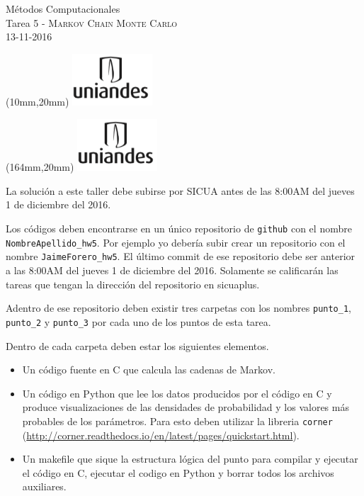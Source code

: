 \documentclass[11pt,letterpaper]{exam}
\begin{document}
\begin{center}
{\Large M\'etodos Computacionales} \\
Tarea 5 - \textsc{Markov Chain Monte Carlo}\\
13-11-2016\\
\end{center}

\begin{textblock*}{40mm}(10mm,20mm)
  \includegraphics[width=3cm]{logoUniandes.png}
\end{textblock*}

\begin{textblock*}{40mm}(164mm,20mm)
  \includegraphics[width=3cm]{logoUniandes.png}
\end{textblock*}

\vspace{0.3cm}


\noindent
La solución a este taller debe subirse por SICUA antes de las 8:00AM
del jueves 1 de diciembre del 2016. 

\noindent
Los c\'odigos deben encontrarse en un \'unico repositorio de \verb'github'
con el nombre \verb"NombreApellido_hw5". Por ejemplo yo deber\'ia
subir crear un repositorio con el nombre
\verb"JaimeForero_hw5". El \'ultimo commit de ese repositorio debe ser
anterior a las 8:00AM del jueves 1 de diciembre del 2016. 
Solamente se calificar\'an las tareas que tengan la direcci\'on 
del repositorio en sicuaplus.

\noindent
Adentro de ese repositorio deben existir tres
carpetas con los nombres \verb"punto_1", \verb"punto_2" y
\verb"punto_3" por cada uno de los puntos de esta tarea.  

\noindent
Dentro de cada carpeta deben estar los siguientes elementos.
\begin{itemize}
\item Un c\'odigo fuente en C que calcula las cadenas de Markov.
\item Un c\'odigo en Python que lee los datos producidos por el
  c\'odigo en C y produce visualizaciones de las densidades de
  probabilidad y los valores m\'as probables de los par\'ametros.
  Para esto deben utilizar la
  libreria \verb"corner"
  (\url{http://corner.readthedocs.io/en/latest/pages/quickstart.html}).
\item Un makefile que sique la estructura l\'ogica del punto para
  compilar y ejecutar el c\'odigo en C, ejecutar el codigo en Python y
  borrar todos los archivos auxiliares.   
\end{itemize}
\end{document}
